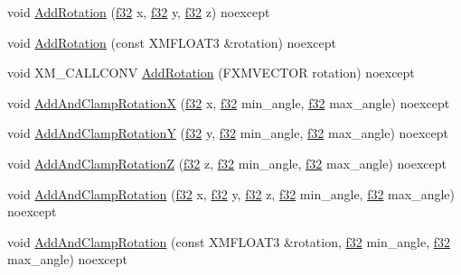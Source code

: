 \begin{DoxyCompactItemize}
void \hyperlink{structmage_1_1_transform_node_a6968b2eb808da4808434a473841e5f3a}{Add\+Rotation} (\hyperlink{namespacemage_a6a44ad388483959dc4dff9f2aef91431}{f32} x, \hyperlink{namespacemage_a6a44ad388483959dc4dff9f2aef91431}{f32} y, \hyperlink{namespacemage_a6a44ad388483959dc4dff9f2aef91431}{f32} z) noexcept
\item 
void \hyperlink{structmage_1_1_transform_node_a4851628300467126db36aa28e6e2aa63}{Add\+Rotation} (const X\+M\+F\+L\+O\+A\+T3 \&rotation) noexcept
\item 
void X\+M\+\_\+\+C\+A\+L\+L\+C\+O\+NV \hyperlink{structmage_1_1_transform_node_af0bc80ccd27d20204e73496cdb68e14b}{Add\+Rotation} (F\+X\+M\+V\+E\+C\+T\+OR rotation) noexcept
\item 
void \hyperlink{structmage_1_1_transform_node_a14e0e68dd3cda39a0f8bc20ddfb99c38}{Add\+And\+Clamp\+RotationX} (\hyperlink{namespacemage_a6a44ad388483959dc4dff9f2aef91431}{f32} x, \hyperlink{namespacemage_a6a44ad388483959dc4dff9f2aef91431}{f32} min\+\_\+angle, \hyperlink{namespacemage_a6a44ad388483959dc4dff9f2aef91431}{f32} max\+\_\+angle) noexcept
\item 
void \hyperlink{structmage_1_1_transform_node_a30e31e00f56acfd6079e90aaaeddf2e2}{Add\+And\+Clamp\+RotationY} (\hyperlink{namespacemage_a6a44ad388483959dc4dff9f2aef91431}{f32} y, \hyperlink{namespacemage_a6a44ad388483959dc4dff9f2aef91431}{f32} min\+\_\+angle, \hyperlink{namespacemage_a6a44ad388483959dc4dff9f2aef91431}{f32} max\+\_\+angle) noexcept
\item 
void \hyperlink{structmage_1_1_transform_node_ad023aa249c9a2e221b324f656768874b}{Add\+And\+Clamp\+RotationZ} (\hyperlink{namespacemage_a6a44ad388483959dc4dff9f2aef91431}{f32} z, \hyperlink{namespacemage_a6a44ad388483959dc4dff9f2aef91431}{f32} min\+\_\+angle, \hyperlink{namespacemage_a6a44ad388483959dc4dff9f2aef91431}{f32} max\+\_\+angle) noexcept
\item 
void \hyperlink{structmage_1_1_transform_node_aff3cafb5ce75776a6b120df4d3f427e8}{Add\+And\+Clamp\+Rotation} (\hyperlink{namespacemage_a6a44ad388483959dc4dff9f2aef91431}{f32} x, \hyperlink{namespacemage_a6a44ad388483959dc4dff9f2aef91431}{f32} y, \hyperlink{namespacemage_a6a44ad388483959dc4dff9f2aef91431}{f32} z, \hyperlink{namespacemage_a6a44ad388483959dc4dff9f2aef91431}{f32} min\+\_\+angle, \hyperlink{namespacemage_a6a44ad388483959dc4dff9f2aef91431}{f32} max\+\_\+angle) noexcept
\item 
void \hyperlink{structmage_1_1_transform_node_aa1be3e25b705535cc292b8c83e2663d0}{Add\+And\+Clamp\+Rotation} (const X\+M\+F\+L\+O\+A\+T3 \&rotation, \hyperlink{namespacemage_a6a44ad388483959dc4dff9f2aef91431}{f32} min\+\_\+angle, \hyperlink{namespacemage_a6a44ad388483959dc4dff9f2aef91431}{f32} max\+\_\+angle) noexcept

\end{DoxyCompactItemize}
